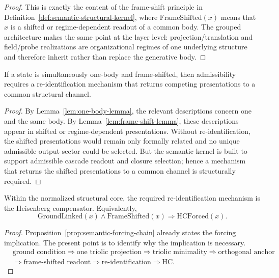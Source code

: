 \begin{proof}
This is exactly the content of the frame-shift principle in
Definition~\ref{def:semantic-structural-kernel}, where
$\mathrm{FrameShifted}(x)$ means that $x$ is a shifted or regime-dependent
readout of a common body. The grouped architecture makes the same point at the
layer level: projection/translation and field/probe realizations are
organizational regimes of one underlying structure and therefore inherit rather
than replace the generative body.
\end{proof}

\begin{lemma}
\label{lem:re-identification-lemma}
If a state is simultaneously one-body and frame-shifted, then admissibility
requires a re-identification mechanism that returns competing presentations to a
common structural channel.
\end{lemma}

\begin{proof}
By Lemma~\ref{lem:one-body-lemma}, the relevant descriptions concern one and the
same body. By Lemma~\ref{lem:frame-shift-lemma}, these descriptions appear in
shifted or regime-dependent presentations. Without re-identification, the
shifted presentations would remain only formally related and no unique
admissible output sector could be selected. But the semantic kernel is built to
support admissible cascade readout and closure selection; hence a mechanism that
returns the shifted presentations to a common channel is structurally required.
\end{proof}

\begin{theorem}
\label{thm:hc-forcing-theorem}
Within the normalized structural core, the required re-identification mechanism
is the Heisenberg compensator. Equivalently,
\[
\mathrm{GroundLinked}(x)\wedge \mathrm{FrameShifted}(x)
\Longrightarrow \mathrm{HCForced}(x).
\]
\end{theorem}

\begin{proof}
Proposition~\ref{prop:semantic-forcing-chain} already states the forcing
implication. The present point is to identify why the implication is necessary.
\[
\begin{aligned}
&\text{ground condition}
\Longrightarrow
\text{one triolic projection}
\Longrightarrow
\text{triolic minimality}
\Longrightarrow
\text{orthogonal anchor}
\\[0.2em]
&\Longrightarrow
\text{frame-shifted readout}
\Longrightarrow
\text{re-identification}
\Longrightarrow
\mathrm{HC}.
\end{aligned}
\]
\end{proof}

